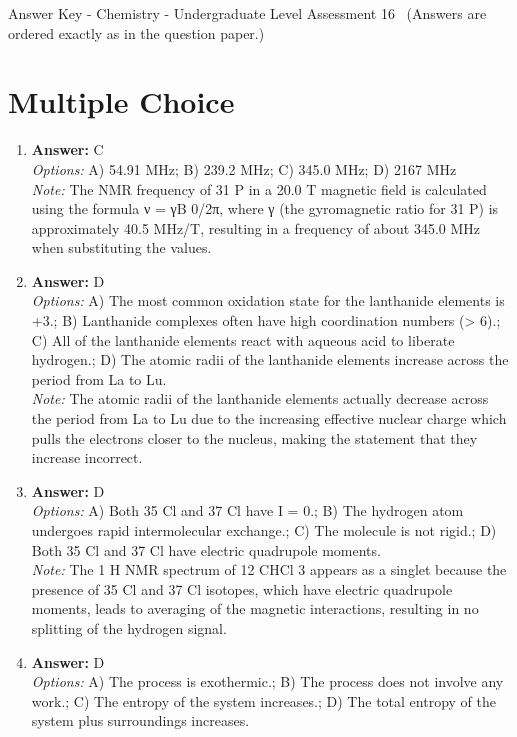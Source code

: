 \documentclass[12pt]{article}
\begin{document}
\begin{center}
Answer Key - Chemistry - Undergraduate Level Assessment 16 \
\small (Answers are ordered exactly as in the question paper.)
\end{center}

\section*{Multiple Choice}
\begin{enumerate}[label=\arabic*.]
\item \textbf{Answer:} C
\\ \textit{Options:} A) 54.91 MHz; B) 239.2 MHz; C) 345.0 MHz; D) 2167 MHz
\\ \textit{Note:} The NMR frequency of 31 P in a 20.0 T magnetic field is calculated using the formula ν = γB 0/2π, where γ (the gyromagnetic ratio for 31 P) is approximately 40.5 MHz/T, resulting in a frequency of about 345.0 MHz when substituting the values.
\item \textbf{Answer:} D
\\ \textit{Options:} A) The most common oxidation state for the lanthanide elements is +3.; B) Lanthanide complexes often have high coordination numbers (\textgreater{} 6).; C) All of the lanthanide elements react with aqueous acid to liberate hydrogen.; D) The atomic radii of the lanthanide elements increase across the period from La to Lu.
\\ \textit{Note:} The atomic radii of the lanthanide elements actually decrease across the period from La to Lu due to the increasing effective nuclear charge which pulls the electrons closer to the nucleus, making the statement that they increase incorrect.
\item \textbf{Answer:} D
\\ \textit{Options:} A) Both 35 Cl and 37 Cl have I = 0.; B) The hydrogen atom undergoes rapid intermolecular exchange.; C) The molecule is not rigid.; D) Both 35 Cl and 37 Cl have electric quadrupole moments.
\\ \textit{Note:} The 1 H NMR spectrum of 12 CHCl 3 appears as a singlet because the presence of 35 Cl and 37 Cl isotopes, which have electric quadrupole moments, leads to averaging of the magnetic interactions, resulting in no splitting of the hydrogen signal.
\item \textbf{Answer:} D
\\ \textit{Options:} A) The process is exothermic.; B) The process does not involve any work.; C) The entropy of the system increases.; D) The total entropy of the system plus surroundings increases.

\end{enumerate}
\end{document}
